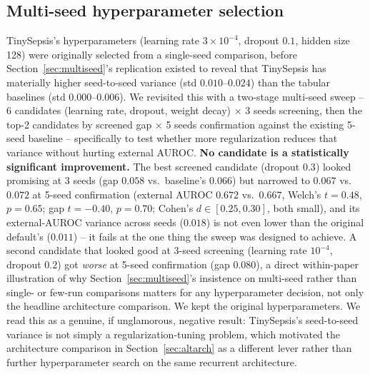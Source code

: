 \documentclass[11pt]{article}
\begin{document}
\subsection{Multi-seed hyperparameter selection}
\label{sec:hpsweep}
TinySepsis's hyperparameters (learning rate $3\times10^{-4}$, dropout $0.1$, hidden size 128) were originally selected from a single-seed comparison, before Section~\ref{sec:multiseed}'s replication existed to reveal that TinySepsis has materially higher seed-to-seed variance (std $0.010$--$0.024$) than the tabular baselines (std $0.000$--$0.006$). We revisited this with a two-stage multi-seed sweep -- 6 candidates (learning rate, dropout, weight decay) $\times$ 3 seeds screening, then the top-2 candidates by screened gap $\times$ 5 seeds confirmation against the existing 5-seed baseline -- specifically to test whether more regularization reduces that variance without hurting external AUROC. \textbf{No candidate is a statistically significant improvement.} The best screened candidate (dropout $0.3$) looked promising at 3 seeds (gap $0.058$ vs.\ baseline's $0.066$) but narrowed to $0.067$ vs.\ $0.072$ at 5-seed confirmation (external AUROC $0.672$ vs.\ $0.667$, Welch's $t=0.48$, $p=0.65$; gap $t=-0.40$, $p=0.70$; Cohen's $d\in[0.25,0.30]$, both small), and its external-AUROC variance across seeds ($0.018$) is not even lower than the original default's ($0.011$) -- it fails at the one thing the sweep was designed to achieve. A second candidate that looked good at 3-seed screening (learning rate $10^{-4}$, dropout $0.2$) got \emph{worse} at 5-seed confirmation (gap $0.080$), a direct within-paper illustration of why Section~\ref{sec:multiseed}'s insistence on multi-seed rather than single- or few-run comparisons matters for any hyperparameter decision, not only the headline architecture comparison. We kept the original hyperparameters. We read this as a genuine, if unglamorous, negative result: TinySepsis's seed-to-seed variance is not simply a regularization-tuning problem, which motivated the architecture comparison in Section~\ref{sec:altarch} as a different lever rather than further hyperparameter search on the same recurrent architecture.
\end{document}
